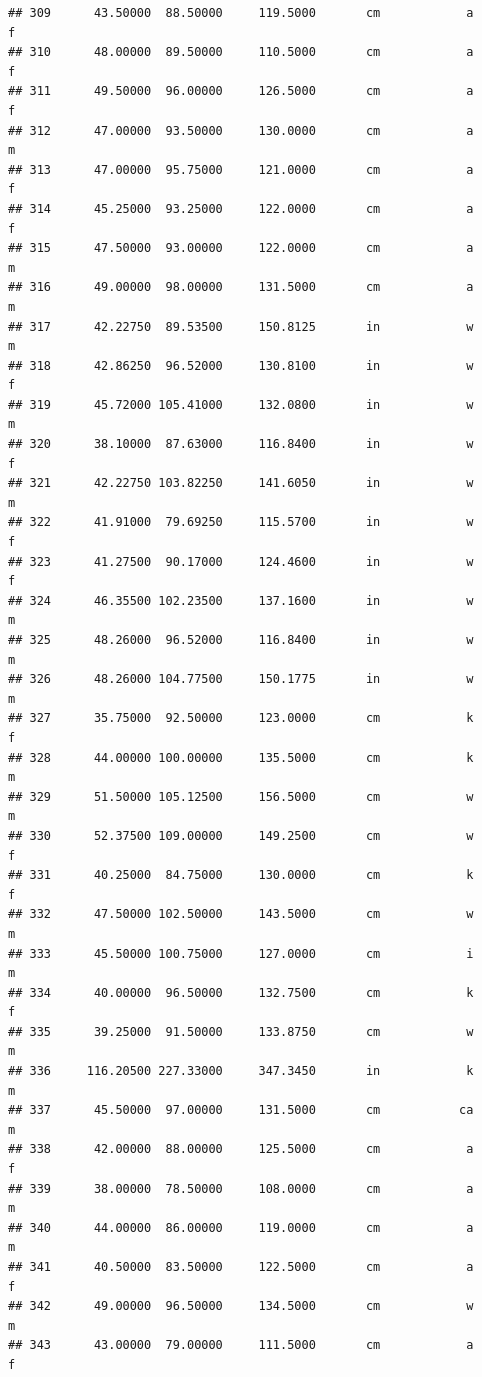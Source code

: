 \documentclass[]{article}
\begin{document}
\begin{verbatim}
## 309      43.50000  88.50000     119.5000       cm            a         f
## 310      48.00000  89.50000     110.5000       cm            a         f
## 311      49.50000  96.00000     126.5000       cm            a         f
## 312      47.00000  93.50000     130.0000       cm            a         m
## 313      47.00000  95.75000     121.0000       cm            a         f
## 314      45.25000  93.25000     122.0000       cm            a         f
## 315      47.50000  93.00000     122.0000       cm            a         m
## 316      49.00000  98.00000     131.5000       cm            a         m
## 317      42.22750  89.53500     150.8125       in            w         m
## 318      42.86250  96.52000     130.8100       in            w         f
## 319      45.72000 105.41000     132.0800       in            w         m
## 320      38.10000  87.63000     116.8400       in            w         f
## 321      42.22750 103.82250     141.6050       in            w         m
## 322      41.91000  79.69250     115.5700       in            w         f
## 323      41.27500  90.17000     124.4600       in            w         f
## 324      46.35500 102.23500     137.1600       in            w         m
## 325      48.26000  96.52000     116.8400       in            w         m
## 326      48.26000 104.77500     150.1775       in            w         m
## 327      35.75000  92.50000     123.0000       cm            k         f
## 328      44.00000 100.00000     135.5000       cm            k         m
## 329      51.50000 105.12500     156.5000       cm            w         m
## 330      52.37500 109.00000     149.2500       cm            w         f
## 331      40.25000  84.75000     130.0000       cm            k         f
## 332      47.50000 102.50000     143.5000       cm            w         m
## 333      45.50000 100.75000     127.0000       cm            i         m
## 334      40.00000  96.50000     132.7500       cm            k         f
## 335      39.25000  91.50000     133.8750       cm            w         m
## 336     116.20500 227.33000     347.3450       in            k         m
## 337      45.50000  97.00000     131.5000       cm           ca         m
## 338      42.00000  88.00000     125.5000       cm            a         f
## 339      38.00000  78.50000     108.0000       cm            a         m
## 340      44.00000  86.00000     119.0000       cm            a         m
## 341      40.50000  83.50000     122.5000       cm            a         f
## 342      49.00000  96.50000     134.5000       cm            w         m
## 343      43.00000  79.00000     111.5000       cm            a         f

\end{verbatim}
\end{document}
